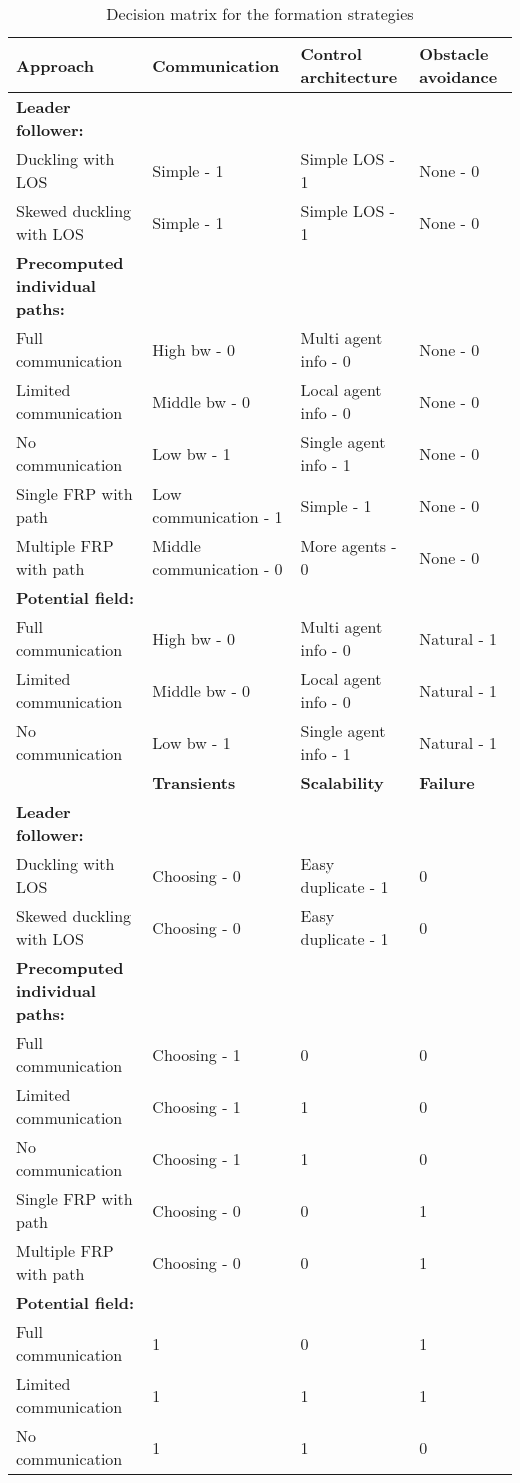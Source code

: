 \begin{sidewaystable}
\begin{tabular}{l|lll}
\toprule
\textbf{Approach} & \textbf{Communication} & \textbf{Control architecture} & \textbf{Obstacle avoidance} \\
\hline
\textbf{Leader follower:}&&&\\
Duckling with LOS& Simple - 1 & Simple LOS - 1 & None - 0 \\
Skewed duckling with LOS& Simple - 1 & Simple LOS - 1 & None - 0 \\
\textbf{Precomputed individual paths:}&&&\\
Full communication& High bw - 0 & Multi agent info - 0 & None - 0 \\
Limited communication& Middle bw - 0 & Local agent info - 0 & None - 0 \\
No communication& Low bw - 1 & Single agent info - 1 & None - 0 \\
Single \ac{FRP} with path& Low communication - 1 & Simple - 1 & None - 0 \\
Multiple \ac{FRP} with path& Middle communication - 0 & More agents - 0 & None - 0 \\
\textbf{Potential field:}&&&\\
Full communication& High bw - 0 & Multi agent info - 0 & Natural - 1 \\
Limited communication& Middle bw - 0 & Local agent info - 0 & Natural - 1 \\
No communication& Low bw - 1 & Single agent info - 1 & Natural - 1\\
\bottomrule
 & \textbf{Transients} & \textbf{Scalability} & \textbf{Failure}\\
\hline
\textbf{Leader follower:}&&&\\
Duckling with LOS   & Choosing - 0 & Easy duplicate - 1 & 0 \\
Skewed duckling with LOS & Choosing - 0 & Easy duplicate - 1 & 0 \\
\textbf{Precomputed individual paths:}&&&\\
Full communication   & Choosing - 1 & 0 & 0 \\
Limited communication   & Choosing - 1 & 1 & 0 \\
No communication   & Choosing - 1 & 1 & 0 \\
Single \ac{FRP} with path   & Choosing - 0 & 0 & 1 \\
Multiple \ac{FRP} with path   & Choosing - 0 & 0 & 1 \\
\textbf{Potential field:}&&&\\
Full communication    & 1 & 0 & 1 \\
Limited communication    & 1 & 1 & 1 \\
No communication    & 1 & 1 & 0 \\
\end{tabular}
\caption{Decision matrix for the formation strategies}
\label{tab:decision-matrix}
\end{sidewaystable}

